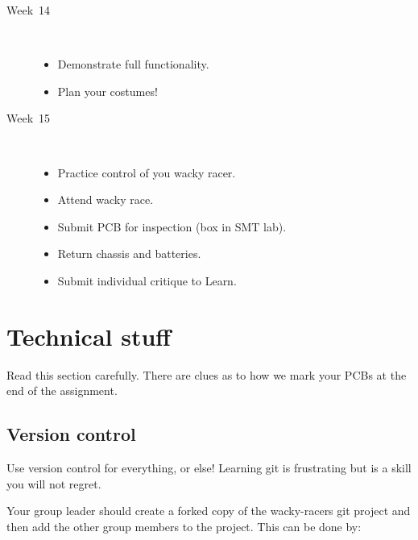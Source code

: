 \documentclass[11pt, a4paper]{article}
\begin{document}
\begin{description}
\item [Week~14]\mbox{}\\
  
  \begin{itemize}
  \item Demonstrate full functionality.
  \item Plan your costumes!
  \end{itemize}
  
\item [Week~15]\mbox{}\\
  
  \begin{itemize}
  \item Practice control of you wacky racer.
  \item Attend wacky race.
  \item Submit PCB for inspection (box in SMT lab).
  \item Return chassis and batteries.
  \item Submit individual critique to Learn.    
  \end{itemize}
  
\end{description}



\section{Technical stuff}

Read this section carefully.  There are clues as to how we mark your PCBs at the
end of the assignment.

\subsection{Version control}

Use version control for everything, or else!  Learning git is frustrating but is
a skill you will not regret.

Your group leader should create a forked copy of the wacky-racers git project
and then add the other group members to the project.  This can be done by:
\end{document}
